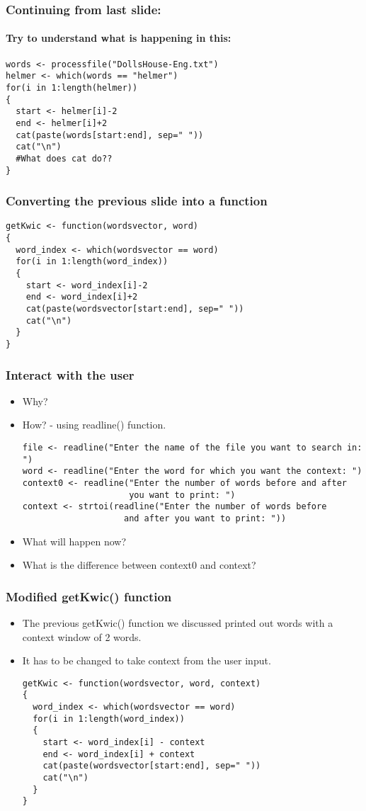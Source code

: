 \documentclass{beamer}
\begin{document}
\begin{frame}[fragile]
\frametitle{Continuing from last slide: }
\framesubtitle{Try to understand what is happening in this:}
\footnotesize
\begin{verbatim}
words <- processfile("DollsHouse-Eng.txt")
helmer <- which(words == "helmer")
for(i in 1:length(helmer))
{
  start <- helmer[i]-2
  end <- helmer[i]+2
  cat(paste(words[start:end], sep=" "))
  cat("\n")
  #What does cat do??
}
\end{verbatim}
\end{frame}

\begin{frame}[fragile]
\frametitle{Converting the previous slide into a function}
\footnotesize
\begin{verbatim}
getKwic <- function(wordsvector, word)
{
  word_index <- which(wordsvector == word) 
  for(i in 1:length(word_index))
  {
    start <- word_index[i]-2
    end <- word_index[i]+2
    cat(paste(wordsvector[start:end], sep=" ")) 
    cat("\n")
  }
}
\end{verbatim}
\end{frame}

\begin{frame}[fragile]
\frametitle{Interact with the user}
\begin{itemize}
\item Why? \pause
\item How? - using readline() function.
\scriptsize
\begin{verbatim}
file <- readline("Enter the name of the file you want to search in: ")
word <- readline("Enter the word for which you want the context: ")
context0 <- readline("Enter the number of words before and after 
                     you want to print: ")
context <- strtoi(readline("Enter the number of words before 
                    and after you want to print: "))
\end{verbatim}
\item What will happen now?
\item What is the difference between context0 and context?
\end{itemize}
\end{frame}

\begin{frame}[fragile]
\frametitle{Modified getKwic() function}
\begin{itemize}
\item The previous getKwic() function we discussed printed out words with a context window of 2 words. 
\item It has to be changed to take context from the user input.
\footnotesize
\begin{verbatim}
getKwic <- function(wordsvector, word, context)
{
  word_index <- which(wordsvector == word) 
  for(i in 1:length(word_index))
  {
    start <- word_index[i] - context
    end <- word_index[i] + context
    cat(paste(wordsvector[start:end], sep=" ")) 
    cat("\n")
  }
}
\end{verbatim}
\end{itemize}
\end{frame}
\end{document}
